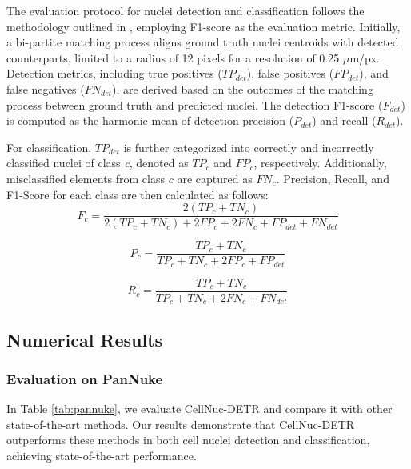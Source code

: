 The evaluation protocol for nuclei detection and classification follows the methodology outlined in \cite{graham2019hover}, employing F1-score as the evaluation metric. Initially, a bi-partite matching process aligns ground truth nuclei centroids with detected counterparts, limited to a radius of 12 pixels for a resolution of 0.25 $\mu$m/px. Detection metrics, including true positives ($TP_{det}$), false positives ($FP_{det}$), and false negatives ($FN_{det}$), are derived based on the outcomes of the matching process between ground truth and predicted nuclei. The detection F1-score ($F_{det}$) is computed as the harmonic mean of detection precision ($P_{det}$) and recall ($R_{det}$).

For classification, $TP_{det}$ is further categorized into correctly and incorrectly classified nuclei of class \textit{c}, denoted as $TP_c$ and $FP_c$, respectively. Additionally, misclassified elements from class $c$ are captured as $FN_c$. Precision, Recall, and F1-Score for each class are then calculated as follows:
\begin{equation}
    F_c = \frac{2(TP_c +TN_c)}{2(TP_c +TN_c)+2FP_c +2FN_c +FP_{det} +FN_{det}}
\end{equation}

\begin{equation}
    P_c = \frac{TP_c +TN_c}{TP_c +TN_c +2FP_c +FP_{det}}
\end{equation}

\begin{equation}
    R_c = \frac{TP_c +TN_c}{TP_c +TN_c +2FN_c +FN_{det}}
\end{equation}

\subsection{Numerical Results}
\label{sec:results:numerical}

\subsubsection{Evaluation on PanNuke}
\label{sec:results:numerical:pannuke}

In Table \ref{tab:pannuke}, we evaluate CellNuc-DETR and compare it with other state-of-the-art methods. Our results demonstrate that CellNuc-DETR outperforms these methods in both cell nuclei detection and classification, achieving state-of-the-art performance.

